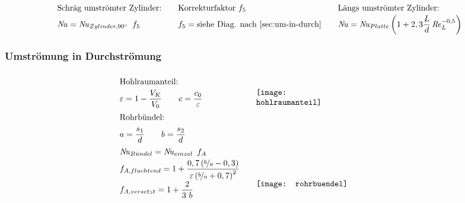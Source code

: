 	\setlength{\abovedisplayskip}{-10pt}
	\[ \arraycolsep=1em  \def\arraystretch{1.5}
	\begin{array}{lll}
		\text{Schräg umströmter Zylinder:}
			& \text{Korrekturfaktor } f_5
			& \text{Längs umströmter Zylinder:} \\
		 \Nuss = \Nuss_{Zylinder,\ang{90}} \ f_5
			&  f_5 = \text{siehe Diag. nach \ref{sec:um-in-durch}}
			&  \Nuss =  \Nuss_{Platte}  \left(1+ 2,3 \dfrac{L}{d} \Reyn_L^{-0,5}\right)
	\end{array}\]

\subsubsection{Umströmung in Durchströmung} \label{sec:um-in-durch}
		\skipabove{-20pt}
		\[ \arraycolsep=1em  \def\arraystretch{1.7}
		\begin{array}{ll}
			\text{Hohlraumanteil:}                                                                                            & \multirow{3}{0.24\textwidth}{\texttt{[image: hohlraumanteil]}} \\
			\varepsilon = 1- \dfrac{V_K}{V_0}  \qquad  c = \dfrac{c_0}{\varepsilon}                                           &                                                                                  \\
			\text{Rohrbündel:}                                                                                                & \multirow{9}{0.5\textwidth}{\texttt{[image: rohrbuendel]}}     \\
			a = \dfrac{s_1}{d}  \qquad  b = \dfrac{s_2}{d}                                                                    &                                                                                  \\
			\Nuss_{B\ue ndel} = \Nuss_{einzel}\ f_A                                                                           &                                                                                  \\
			f_{A,fluchtend} = 1+ \dfrac{0,7 \left(\nicefrac{b}{a}-0,3\right)}{\varepsilon \left(\nicefrac{b}{a}+0,7\right)^2} &                                                                                  \\
			f_{A,versetzt} = 1 + \dfrac{2}{3\ b}                                                                              &                                                                                  \\

\end{array}\]
